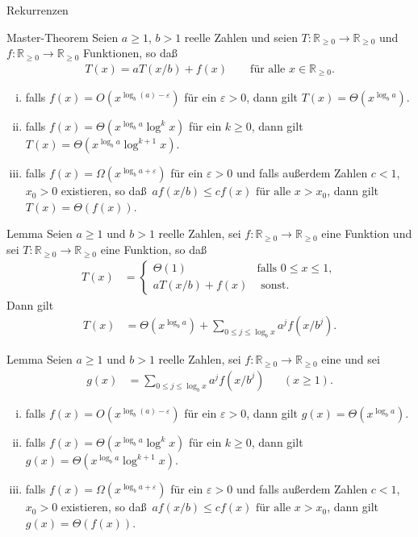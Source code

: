 \documentclass[aspectratio=1610, 11pt]{beamer}
\newcommand\RRpos{\mathbb R_{\geq0}}
\newcommand{\eps}{\varepsilon}
\begin{document}
\begin{frame}{Rekurrenzen}
	\begin{overprint}
	\begin{block}{Master-Theorem}
	Seien $a\geq1$, $b>1$ reelle Zahlen und seien $T:\RRpos\to\RRpos$ und $f:\RRpos\to\RRpos$ Funktionen, so da\ss
	\begin{align*}
		T(x)=aT(x/b)+f(x)\qquad\mbox{f\"ur alle }x\in\RRpos.
	\end{align*}
	\vspace{-5mm}
	\begin{enumerate}[(i)]
		\item falls $f(x)=O(x^{\log_b(a)-\eps})$ f\"ur ein $\eps>0$, dann gilt $T(x)=\Theta(x^{\log_ba})$.
		\item falls $f(x)=\Theta(x^{\log_ba}\log^kx)$ f\"ur ein $k\geq0$, dann gilt $T(x)=\Theta(x^{\log_ba}\log^{k+1}x)$.
		\item falls $f(x)=\Omega(x^{\log_ba+\eps})$ f\"ur ein $\eps>0$ und falls au\ss erdem  Zahlen $c<1$, $x_0>0$ existieren, so da\ss\ $ af(x/b)\leq cf(x)\mbox{ f\"ur alle }x>x_0$, dann gilt $T(x)=\Theta(f(x))$.
	\end{enumerate}
	\end{block}
		\begin{block}{Lemma}
	Seien $a\geq1$ und $b>1$ reelle Zahlen, sei $f:\RRpos\to\RRpos$ eine Funktion und sei $T:\RRpos\to\RRpos$ eine Funktion, so da\ss
	\begin{align}\label{eqlem_master1_1}
		T(x)&=\begin{cases}\Theta(1)&\mbox{falls }0\leq x\leq 1,\\ aT(x/b)+f(x)&\mbox{ sonst.}\end{cases}
	\end{align}
	Dann gilt
	\begin{align}\label{eqlem_master1}
		T(x)&=\Theta(x^{\log_ba})+\sum_{0\leq j\leq\log_bx}a^jf(x/b^j).
	\end{align}
		\end{block}
		\begin{block}{Lemma}
	Seien $a\geq1$ und $b>1$ reelle Zahlen, sei $f:\RRpos\to\RRpos$ eine und sei
	\begin{align}\label{eqlem_master2_1}
		g(x)&=\sum_{0\leq j\leq\log_bx}a^jf(x/b^j)&&(x\geq1).
	\end{align}
	\begin{enumerate}[(i)]
		\item falls $f(x)=O(x^{\log_b(a)-\eps})$ f\"ur ein $\eps>0$, dann gilt $g(x)=\Theta(x^{\log_ba})$.
		\item falls $f(x)=\Theta(x^{\log_ba}\log^kx)$ f\"ur ein $k\geq0$, dann gilt $g(x)=\Theta(x^{\log_ba}\log^{k+1}x)$.
		\item falls $f(x)=\Omega(x^{\log_ba+\eps})$ f\"ur ein $\eps>0$ und falls au\ss erdem  Zahlen $c<1$, $x_0>0$ existieren, so da\ss\ $af(x/b)\leq cf(x)\mbox{ f\"ur alle }x>x_0$, dann gilt $g(x)=\Theta(f(x))$.
	\end{enumerate}
		\end{block}
	\end{overprint}
\end{frame}
\end{document}
